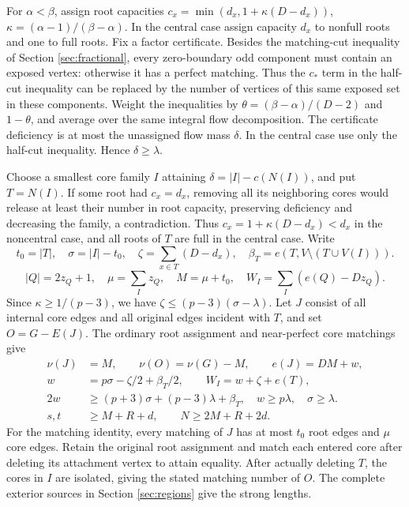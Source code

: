\documentclass[11pt,a4paper]{article}
\theoremstyle{definition}
\begin{document}
For $\alpha<\beta$, assign root capacities
$c_x=\min(d_x,1+\kappa(D-d_x))$, $\kappa=(\alpha-1)/(\beta-\alpha)$.
In the central case assign capacity $d_x$ to nonfull roots and one to full roots. Fix a factor certificate. Besides the matching-cut inequality of Section \ref{sec:fractional}, every zero-boundary odd component must contain an exposed vertex: otherwise it has a perfect matching. Thus the $c_*$ term in the half-cut inequality can be replaced by the number of vertices of this same exposed set in these components. Weight the inequalities by $\theta=(\beta-\alpha)/(D-2)$ and $1-\theta$, and average over the same integral flow decomposition. The certificate deficiency is at most the unassigned flow mass $\delta$. In the central case use only the half-cut inequality. Hence $\delta\ge\lambda$.

Choose a smallest core family $I$ attaining $\delta=|I|-c(N(I))$, and put $T=N(I)$. If some root had $c_x=d_x$, removing all its neighboring cores would release at least their number in root capacity, preserving deficiency and decreasing the family, a contradiction. Thus $c_x=1+\kappa(D-d_x)<d_x$ in the noncentral case, and all roots of $T$ are full in the central case. Write
\[
t_0=|T|,\quad \sigma=|I|-t_0,\quad
\zeta=\sum_{x\in T}(D-d_x),\quad \beta_T=e(T,V\setminus(T\cup V(I))).
\]
\[
|Q|=2z_Q+1,\quad \mu=\sum_Iz_Q,\quad M=\mu+t_0,\quad
W_I=\sum_I(e(Q)-Dz_Q).
\]
Since $\kappa\ge1/(p-3)$, we have $\zeta\le(p-3)(\sigma-\lambda)$. Let $J$ consist of all internal core edges and all original edges incident with $T$, and set $O=G-E(J)$. The ordinary root assignment and near-perfect core matchings give
\begin{align}
\nu(J)&=M,\qquad \nu(O)=\nu(G)-M,\qquad e(J)=DM+w,\\
w&=p\sigma-\zeta/2+\beta_T/2,\qquad W_I=w+\zeta+e(T),\\
2w&\ge(p+3)\sigma+(p-3)\lambda+\beta_T,\quad
w\ge p\lambda,\quad \sigma\ge\lambda. \label{eq:weighted-pack}\\
s,t&\ge M+R+d,\qquad N\ge2M+R+2d. \label{eq:weighted-length}
\end{align}
For the matching identity, every matching of $J$ has at most $t_0$ root edges and $\mu$ core edges. Retain the original root assignment and match each entered core after deleting its attachment vertex to attain equality. After actually deleting $T$, the cores in $I$ are isolated, giving the stated matching number of $O$. The complete exterior sources in Section \ref{sec:regions} give the strong lengths.
\end{document}
